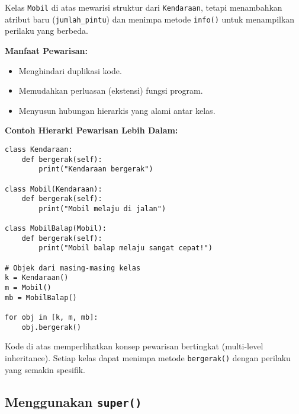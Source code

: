 Kelas \texttt{Mobil} di atas mewarisi struktur dari \texttt{Kendaraan}, tetapi menambahkan atribut baru (\texttt{jumlah\_pintu}) dan menimpa metode \texttt{info()} untuk menampilkan perilaku yang berbeda.

\begin{center}
\end{center}

\noindent\textbf{Manfaat Pewarisan:}
\begin{itemize}
    \item Menghindari duplikasi kode.
    \item Memudahkan perluasan (ekstensi) fungsi program.
    \item Menyusun hubungan hierarkis yang alami antar kelas.
\end{itemize}

\noindent\textbf{Contoh Hierarki Pewarisan Lebih Dalam:}

\begin{lstlisting}[style=PythonStyle, caption={Hierarki Tiga Tingkat}]
class Kendaraan:
    def bergerak(self):
        print("Kendaraan bergerak")

class Mobil(Kendaraan):
    def bergerak(self):
        print("Mobil melaju di jalan")

class MobilBalap(Mobil):
    def bergerak(self):
        print("Mobil balap melaju sangat cepat!")

# Objek dari masing-masing kelas
k = Kendaraan()
m = Mobil()
mb = MobilBalap()

for obj in [k, m, mb]:
    obj.bergerak()
\end{lstlisting}

Kode di atas memperlihatkan konsep pewarisan bertingkat (multi-level inheritance).  
Setiap kelas dapat menimpa metode \texttt{bergerak()} dengan perilaku yang semakin spesifik.

\subsection{Menggunakan \texttt{super()}}

